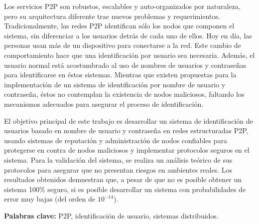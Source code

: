 Los servicios P2P son robustos, escalables y auto-organizados por naturaleza,
pero su arquitectura diferente trae nuevos problemas y requerimientos.
Tradicionalmente, las redes P2P identifican sólo los nodos que componen el
sistema, sin diferenciar a los usuarios detrás de cada uno de ellos.
Hoy en día, las personas usan más de un dispositivo para conectarse a la red.
Este cambio de comportamiento hace que una identificación por usuario sea
necesaria. Además, el usuario normal está acostumbrado al uso de nombres de
usuarios y contraseñas para identificarse en éstos sistemas.
Mientras que existen propuestas para la implementación de un sistema de
identificación por nombre de usuario y contraseña, éstos no contemplan la
existencia de nodos maliciosos, faltando los mecanismos adecuados para
asegurar el proceso de identificación.

El objetivo principal de este trabajo es desarrollar un sistema de
identificación de usuarios basado en nombre de usuario y contraseña en redes
estructuradas P2P, usando sistemas de reputación y administración de nodos
confiables para protegerse en contra de nodos maliciosos y implementar protocolos seguros
en el sistema.
Para la validación del sistema, se realiza un análisis teórico de sus
protocolos para asegurar que no presentan riesgos en ambientes reales.
Los resultados obtenidos demuestran que, a pesar de que no es posible obtener
un sistema 100\% seguro, si es posible desarrollar un sistema con
probabilidades de error muy bajas (del orden de $10^{-14}$).



{\bf Palabras clave:} P2P, identificación de usuario, sistemas distribuidos.
